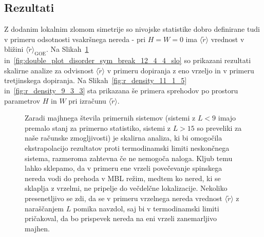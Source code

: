 \documentclass[10pt,a4paper]{article}
\begin{document}
\subsection{Rezultati}
Z dodanim lokalnim zlomom simetrije so nivojske statistike dobro definirane tudi v primeru odsotnosti vsakršnega nereda - pri $H=W=0$ ima $\langle \tilde{r}\rangle$ vrednost v bližini  $\langle \tilde{r}\rangle_\mathrm{GOE}$. Na Slikah~\ref{fig:double_plot_disorder_sym_break_13_1_6_slo} in~\ref{fig:double_plot_disorder_sym_break_12_4_4_slo} so prikazani rezultati skalirne analize za odvisnost $\langle \tilde{r}\rangle$ v primeru dopiranja z eno vrzeljo in v primeru tretjinskega dopiranja. Na Slikah~\ref{fig:r_density_11_1_5} in~\ref{fig:r_density_9_3_3} sta prikazana še primera sprehodov po prostoru parametrov $H$ in $W$ pri izračunu $\langle \tilde{r} \rangle$.
 \begin{figure}[H]
\caption{Zaradi majhnega števila primernih sistemov (sistemi z $L<9$ imajo premalo stanj za primerno statistiko, sistemi z $L>15$ so preveliki za naše računske zmogljivosti) je skalirna analiza, ki bi omogočila ekstrapolacijo rezultatov proti termodinamski limiti neskončnega sistema, razmeroma zahtevna če ne nemogoča naloga. Kljub temu lahko sklepamo, da v primeru ene vrzeli povečevanje spinskega nereda vodi do prehoda v MBL režim, medtem ko nered, ki se sklaplja z vrzelmi, ne pripelje do večdelčne lokalizacije. Nekoliko presenetljivo se zdi, da se v primeru vrzelnega nereda vrednost $\langle \tilde{r}\rangle$ z naraščanjem $L$ pomika navzdol, saj bi v termodinamski limiti pričakoval, da bo prispevek nereda na eni vrzeli zanemarljivo majhen. }
\label{fig:double_plot_disorder_sym_break_13_1_6_slo}
\end{figure} 
\end{document}
